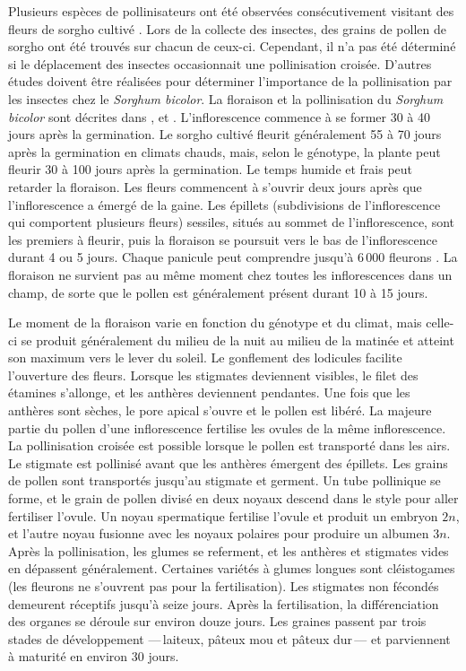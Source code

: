 \documentclass[a4paper,11pt]{article}
\begin{document}
Plusieurs espèces de pollinisateurs ont été observées consécutivement
visitant des fleurs de sorgho cultivé \cite{Immelman_2000,
  Schmidt_2006}. Lors de la collecte des insectes, des grains de
pollen de sorgho ont été trouvés sur chacun de ceux-ci. Cependant, il
n'a pas été déterminé si le déplacement des insectes occasionnait une
pollinisation croisée. D'autres études doivent être réalisées pour
déterminer l'importance de la pollinisation par les insectes chez le
\emph{Sorghum bicolor}. La floraison et la pollinisation du
\emph{Sorghum bicolor} sont décrites dans ,
 et . L'inflorescence commence
à se former 30 à 40 jours après la germination. Le sorgho cultivé
fleurit généralement 55 à 70 jours après la germination en climats
chauds, mais, selon le génotype, la plante peut fleurir 30 à 100 jours
après la germination. Le temps humide et frais peut retarder la
floraison. Les fleurs commencent à s'ouvrir deux jours après que
l'inflorescence a émergé de la gaine. Les épillets (subdivisions de
l'inflorescence qui comportent plusieurs fleurs) sessiles, situés au
sommet de l'inflorescence, sont les premiers à fleurir, puis la
floraison se poursuit vers le bas de l'inflorescence durant 4 ou 5
jours. Chaque panicule peut comprendre jusqu'à 6\,000 fleurons
\cite{QUINBYKARPER_1947}. La floraison ne survient pas au même moment
chez toutes les inflorescences dans un champ, de sorte que le pollen
est généralement présent durant 10 à 15 jours.

Le moment de la floraison varie en fonction du génotype et du climat,
mais celle-ci se produit généralement du milieu de la nuit au milieu
de la matinée et atteint son maximum vers le lever du soleil. Le
gonflement des lodicules facilite l'ouverture des fleurs. Lorsque les
stigmates deviennent visibles, le filet des étamines s'allonge, et les
anthères deviennent pendantes. Une fois que les anthères sont sèches,
le pore apical s'ouvre et le pollen est libéré. La majeure partie du
pollen d'une inflorescence fertilise les ovules de la même
inflorescence. La pollinisation croisée est possible lorsque le pollen
est transporté dans les airs. Le stigmate est pollinisé avant que les
anthères émergent des épillets. Les grains de pollen sont transportés
jusqu'au stigmate et germent. Un tube pollinique se forme, et le grain
de pollen divisé en deux noyaux descend dans le style pour aller
fertiliser l'ovule. Un noyau spermatique fertilise l'ovule et produit
un embryon $2n$, et l'autre noyau fusionne avec les noyaux polaires
pour produire un albumen $3n$. Après la pollinisation, les glumes se
referment, et les anthères et stigmates vides en dépassent
généralement. Certaines variétés à glumes longues sont cléistogames
(les fleurons ne s'ouvrent pas pour la fertilisation). Les stigmates
non fécondés demeurent réceptifs jusqu'à seize jours. Après la
fertilisation, la différenciation des organes se déroule sur environ
douze jours. Les graines passent par trois stades de développement
---\,laiteux, pâteux mou et pâteux dur\,--- et parviennent à maturité
en environ 30 jours.
\end{document}
